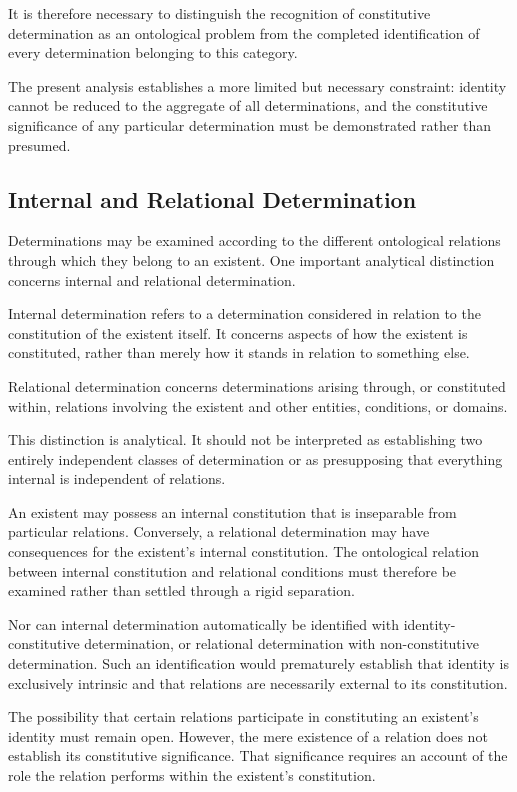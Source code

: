 It is therefore necessary to distinguish the recognition of
constitutive determination as an ontological problem from
the completed identification of every determination belonging
to this category.

The present analysis establishes a more limited but necessary
constraint: identity cannot be reduced to the aggregate of
all determinations, and the constitutive significance of any
particular determination must be demonstrated rather than
presumed.

\subsection{Internal and Relational Determination}

Determinations may be examined according to the different
ontological relations through which they belong to an existent.
One important analytical distinction concerns internal and
relational determination.

Internal determination refers to a determination considered
in relation to the constitution of the existent itself. It
concerns aspects of how the existent is constituted, rather
than merely how it stands in relation to something else.

Relational determination concerns determinations arising
through, or constituted within, relations involving the
existent and other entities, conditions, or domains.

This distinction is analytical. It should not be interpreted
as establishing two entirely independent classes of
determination or as presupposing that everything internal
is independent of relations.

An existent may possess an internal constitution that is
inseparable from particular relations. Conversely, a
relational determination may have consequences for the
existent's internal constitution. The ontological relation
between internal constitution and relational conditions
must therefore be examined rather than settled through
a rigid separation.

Nor can internal determination automatically be identified
with identity-constitutive determination, or relational
determination with non-constitutive determination. Such an
identification would prematurely establish that identity
is exclusively intrinsic and that relations are necessarily
external to its constitution.

The possibility that certain relations participate in
constituting an existent's identity must remain open.
However, the mere existence of a relation does not establish
its constitutive significance. That significance requires
an account of the role the relation performs within the
existent's constitution.

